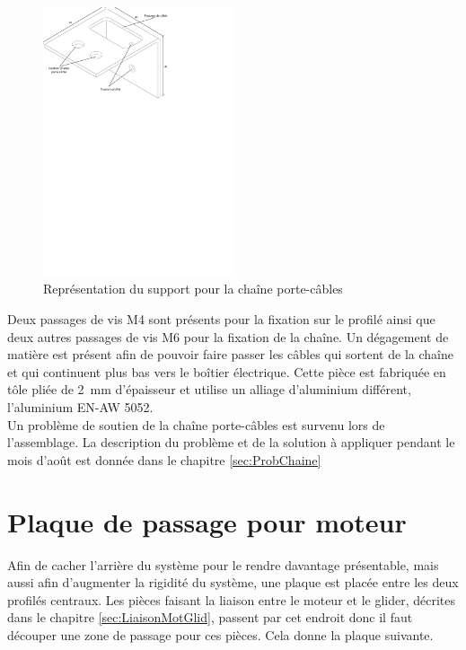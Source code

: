 \begin{figure}[H]
    \centering
    \includegraphics[width = 0.5\textwidth]{assets/figures/SupportChaineCable.svg}
    \caption{Représentation du support pour la chaîne porte-câbles}
    \label{fig:SupChaineCable}
\end{figure}

Deux passages de vis M4 sont présents pour la fixation sur le profilé ainsi que deux autres passages de vis M6 pour la fixation de la chaîne.
Un dégagement de matière est présent afin de pouvoir faire passer les câbles qui sortent de la chaîne et qui continuent plus bas vers le boîtier
électrique. Cette pièce est fabriquée en tôle pliée de 2~mm d'épaisseur et utilise un alliage d'aluminium différent, l'aluminium EN-AW 5052.\\

Un problème de soutien de la chaîne porte-câbles est survenu lors de l'assemblage. La description du problème et de la solution à appliquer
pendant le mois d'août est donnée dans le chapitre \ref{sec:ProbChaine}

\section{Plaque de passage pour moteur}\label{sec:PlaPassMot}
Afin de cacher l'arrière du système pour le rendre davantage présentable, mais aussi afin d'augmenter la rigidité du système, une plaque est placée
entre les deux profilés centraux. Les pièces faisant la liaison entre le moteur et le glider, décrites dans le chapitre \ref{sec:LiaisonMotGlid},
passent par cet endroit donc il faut découper une zone de passage pour ces pièces. Cela donne la plaque suivante.

